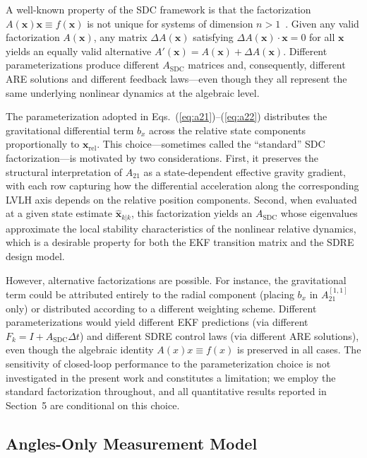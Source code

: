 \documentclass[preprint,3p,times]{elsarticle}
\begin{document}
A well-known property of the SDC framework is that the factorization $A(\mathbf{x})\mathbf{x} \equiv f(\mathbf{x})$ is not unique for systems of dimension $n > 1$~\cite{Cimen2012}. Given any valid factorization $A(\mathbf{x})$, any matrix $\Delta A(\mathbf{x})$ satisfying $\Delta A(\mathbf{x}) \cdot \mathbf{x} = 0$ for all $\mathbf{x}$ yields an equally valid alternative $A'(\mathbf{x}) = A(\mathbf{x}) + \Delta A(\mathbf{x})$. Different parameterizations produce different $A_{\text{SDC}}$ matrices and, consequently, different ARE solutions and different feedback laws---even though they all represent the same underlying nonlinear dynamics at the algebraic level.

The parameterization adopted in Eqs.~(\ref{eq:a21})--(\ref{eq:a22}) distributes the gravitational differential term $b_x$ across the relative state components proportionally to $\mathbf{x}_{\text{rel}}$. This choice---sometimes called the ``standard'' SDC factorization---is motivated by two considerations. First, it preserves the structural interpretation of $A_{21}$ as a state-dependent effective gravity gradient, with each row capturing how the differential acceleration along the corresponding LVLH axis depends on the relative position components. Second, when evaluated at a given state estimate $\hat{\mathbf{x}}_{k|k}$, this factorization yields an $A_{\text{SDC}}$ whose eigenvalues approximate the local stability characteristics of the nonlinear relative dynamics, which is a desirable property for both the EKF transition matrix and the SDRE design model.

However, alternative factorizations are possible. For instance, the gravitational term could be attributed entirely to the radial component (placing $b_x$ in $A_{21}^{[1,1]}$ only) or distributed according to a different weighting scheme. Different parameterizations would yield different EKF predictions (via different $F_k = I + A_{\text{SDC}}\Delta t$) and different SDRE control laws (via different ARE solutions), even though the algebraic identity $A(x)x \equiv f(x)$ is preserved in all cases. The sensitivity of closed-loop performance to the parameterization choice is not investigated in the present work and constitutes a limitation; we employ the standard factorization throughout, and all quantitative results reported in Section~5 are conditional on this choice.

\subsection{Angles-Only Measurement Model}
\end{document}
